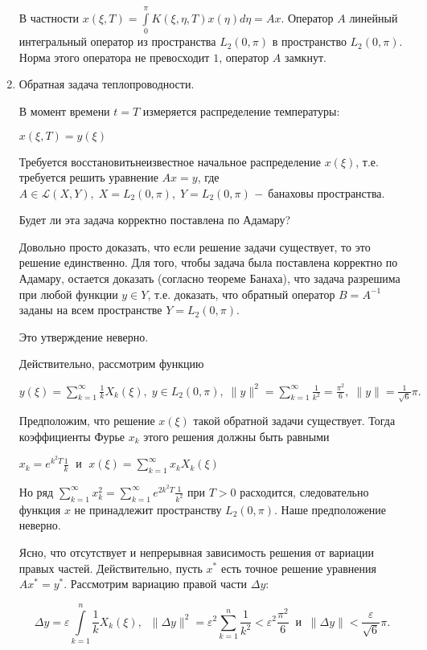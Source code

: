\documentclass[12pt,a4paper,titlepage]{book}
\theoremstyle{definition}
\theoremstyle{plain}
\theoremstyle{remark}
\theoremstyle{remark}
\theoremstyle{remark}
\theoremstyle{plain}
\begin{document}
\begin{enumerate}
В частности $x(\xi,T) = \displaystyle\int\limits_0^\pi K(\xi, \eta, T) x(\eta)d\eta = Ax$. Оператор $A$ линейный интегральный оператор из пространства $L_2(0, \pi)$ в пространство $L_2(0, \pi)$. Норма этого оператора не превосходит $1$, оператор $A$ замкнут.

	\item Обратная задача теплопроводности.

В момент времени $t = T$ измеряется  распределение температуры:
\begin{center}
$x(\xi, T) = y(\xi)$
\end{center}

Требуется \guillemotleft восстановить\guillemotright \;неизвестное начальное распределение $x(\xi)$, т.е. требуется решить уравнение $Ax = y$, где $A\in\mathscr{L}(X,Y), \; X = L_{2}(0, \pi), \; Y = L_{2}(0, \pi)$ $\-- $ банаховы пространства.

Будет ли эта задача корректно поставлена по Адамару?

Довольно просто доказать, что если решение задачи существует, то это решение единственно. Для того, чтобы задача была поставлена корректно по Адамару, остается доказать (согласно теореме Банаха), что задача разрешима при любой функции $y \in Y$, т.е. доказать, что обратный оператор $B = A^{-1}$ заданы на всем пространстве $Y = L_{2}(0, \pi)$.

Это утверждение неверно.

Действительно, рассмотрим функцию
\begin{center}
$y(\xi)=\displaystyle\sum\limits_{k=1}^{\infty} \frac{1}{k} X_k(\xi) ,  \; y\in L_{2}(0, \pi), \; \|y\|^2 = \sum\limits_{k=1}^{\infty} \frac{1}{k^2} = \frac{\pi^2}{6} ,  \; \|y\| = \frac{1}{\sqrt{6}}\pi \mbox{.}$
\end{center}

Предположим, что решение $x(\xi)$ такой обратной задачи существует. Тогда коэффициенты Фурье $x_k$ этого решения должны быть равными
\begin{center}
$x_k=e^{k^2 T} \frac{1}{k} \; \mbox{ и } \; x(\xi) = \displaystyle\sum\limits_{k=1}^{\infty} x_k X_k(\xi)$
\end{center}

Но ряд $\displaystyle\sum\limits_{k=1}^{\infty} x_k^2 = \sum\limits_{k=1}^{\infty} e^{2k^2 T} \frac{1}{k^2}$ при $T > 0$ расходится, следовательно функция $x$ не принадлежит пространству $L_2(0,\pi)$. Наше предположение неверно.

Ясно, что отсутствует и непрерывная зависимость решения от вариации правых частей. Действительно, пусть $x^{*}$ есть точное решение уравнения $Ax^*=y^*$. Рассмотрим вариацию правой части  $\Delta y$:
\begin{center}
$$\Delta y = \varepsilon \int\limits_{k=1}^{n} \frac{1}{k} X_k(\xi) , \; \; \| \Delta y\|^2 = \varepsilon ^2 \sum\limits_{k=1}^{n} \frac{1}{k^2} < \varepsilon^2 \frac{\pi ^2}{6} \; \; \mbox{и} \; \; \| \Delta y \| < \frac{\varepsilon}{\sqrt{6}}\pi.$$
\end{center}


\end{enumerate}
\end{document}
